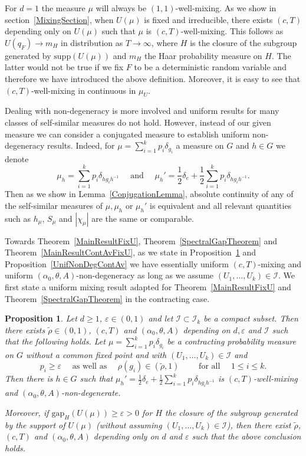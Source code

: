 \documentclass[10pt, english,oneside,reqno]{amsart}
\theoremstyle{plain}
\newtheorem{proposition}[theorem]{Proposition}
\theoremstyle{remark}
\numberwithin{equation}{section}
\numberwithin{figure}{section}
\newcommand{\eps}{\varepsilon}
\newcommand{\Haarof}[1]{m_{#1}}
\begin{document}
    For $d=1$ the measure $\mu$ will always be $(1, 1)$-well-mixing. As we show in section~\ref{MixingSection}, when $U(\mu)$ is fixed and irreducible, there exists $(c,T)$ depending only on $U(\mu)$ such that $\mu$ is $(c,T)$-well-mixing. This follows as $U(q_F) \to \Haarof{H}$ in distribution as $T \to \infty$, where $H$ is the closure of the subgroup generated by $\mathrm{supp}(U(\mu))$ and $\Haarof{H}$ the Haar probability measure on $H$. The latter would not be true if we fix $F$ to be a deterministic random variable and therefore we have introduced the above definition. Moreover, it is easy to see that $(c,T)$-well-mixing in continuous in $\mu_U$.

    Dealing with non-degeneracy is more involved and uniform results for many classes of self-similar measures do not hold. However, instead of our given measure we can consider a conjugated measure to establish uniform non-degeneracy results. Indeed, for $\mu = \sum_{i = 1}^k p_i\delta_{g_i}$ a measure on $G$ and $h\in G$ we denote $$\mu_h = \sum_{i = 1}^k p_i\delta_{hg_ih^{-1}} \quad \text{ and } \quad \mu_h' =\frac{1}{2}\delta_e + \frac{1}{2}\sum_{i = 1}^k p_i\delta_{hg_ih^{-1}}.$$ Then as we show in Lemma~\ref{ConjugationLemma}, absolute continuity of any of the self-similar measures of $\mu,\mu_h$ or $\mu_h'$ is equivalent and all relevant quantities such as $h_{\mu}$, $S_{\mu}$ and $|\chi_{\mu}|$ are the same or comparable. 
    
    Towards Theorem~\ref{MainResultFixU}, Theorem~\ref{SpectralGapTheorem} and Theorem~\ref{MainResultContAvFixU}, as we state in Proposition~\ref{UnifNonDeg} and Proposition~\ref{UnifNonDegContAv} we have essentially uniform $(c,T)$-mixing and uniform $(\alpha_0,\theta, A)$-non-degeneracy as long as we assume $(U_1, \ldots , U_k) \in \mathcal{I}$. We first state a uniform mixing result adapted for Theorem~\ref{MainResultFixU} and Theorem~\ref{SpectralGapTheorem} in the contracting case. 

    \begin{proposition}\label{UnifNonDeg}
    Let $d\geq 1$, $\eps \in (0,1)$ and let $\mathcal{I} \subset \mathcal{I}_k$ be a compact subset. Then there exists $\tilde{\rho} \in (0,1)$, $(c,T)$ and $(\alpha_0,\theta, A)$ depending on $d, \eps$ and $\mathcal{I}$ such that the following holds. Let $\mu = \sum_{i = 1}^k p_i \delta_{g_i}$ be a contracting probability measure on $G$ without a common fixed point and with $(U_1, \ldots , U_k) \in \mathcal{I}$ and $$p_i \geq \eps \quad \text{ as well as } \quad \rho(g_i) \in (\tilde{\rho},1) \quad \quad  \text{ for all } \quad  1 \leq i \leq k.$$ Then there is $h\in G$ such that $\mu_h' =  \frac{1}{2}\delta_e + \frac{1}{2}\sum_{i = 1}^k p_i\delta_{hg_ih^{-1}}$ is $(c,T)$-well-mixing and $(\alpha_0,\theta, A)$-non-degenerate. 

    Moreover, if $\mathrm{gap}_H(U(\mu)) \geq \eps > 0$ for $H$ the closure of the subgroup generated by the support of $U(\mu)$ (without assuming $(U_1, \ldots , U_k) \in \mathcal{I}$), then there exist $\tilde{\rho}$, $(c,T)$ and $(\alpha_0,\theta, A)$ depending only on $d$ and $\eps$ such that the above conclusion holds.
    \end{proposition}
\end{document}
